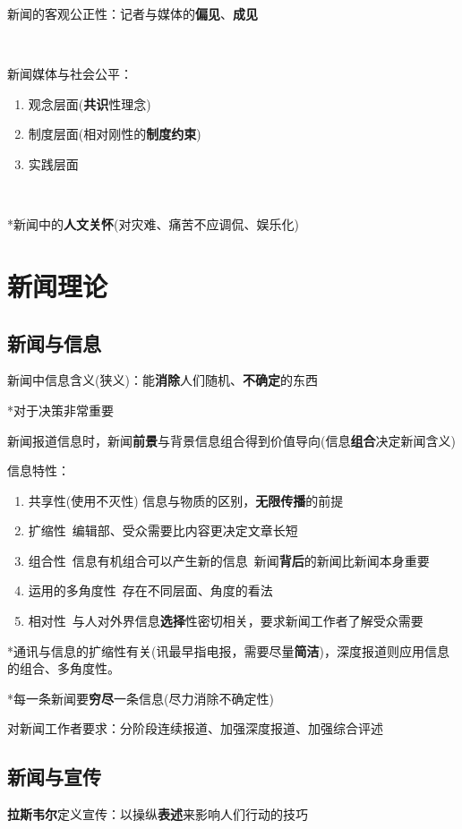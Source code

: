 \documentclass[a4paper,UTF8]{ctexart}
\begin{document}
新闻的客观公正性：记者与媒体的\textbf{偏见}、\textbf{成见}

~

新闻媒体与社会公平：

\begin{enumerate}
	\item 观念层面(\textbf{共识}性理念)
	\item 制度层面(相对刚性的\textbf{制度约束})
	\item 实践层面
\end{enumerate}

~

*新闻中的\textbf{人文关怀}(对灾难、痛苦不应调侃、娱乐化)

\section{新闻理论}
\subsection{新闻与信息}
新闻中信息含义(狭义)：能\textbf{消除}人们随机、\textbf{不确定}的东西

*对于决策非常重要

新闻报道信息时，新闻\textbf{前景}与背景信息组合得到价值导向(信息\textbf{组合}决定新闻含义)

信息特性：

\begin{enumerate}
	\item 共享性(使用不灭性) 信息与物质的区别，\textbf{无限传播}的前提
	\item 扩缩性\ 编辑部、受众需要比内容更决定文章长短
	\item 组合性\ 信息有机组合可以产生新的信息\ 新闻\textbf{背后}的新闻比新闻本身重要
	\item 运用的多角度性\ 存在不同层面、角度的看法
	\item 相对性\ 与人对外界信息\textbf{选择}性密切相关，要求新闻工作者了解受众需要
\end{enumerate}

*通讯与信息的扩缩性有关(讯最早指电报，需要尽量\textbf{简洁})，深度报道则应用信息的组合、多角度性。

*每一条新闻要\textbf{穷尽}一条信息(尽力消除不确定性)

对新闻工作者要求：分阶段连续报道、加强深度报道、加强综合评述

\subsection{新闻与宣传}
\textbf{拉斯韦尔}定义宣传：以操纵\textbf{表述}来影响人们行动的技巧
\end{document}
